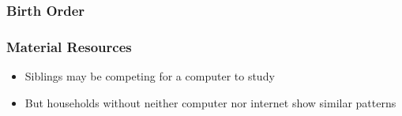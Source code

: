 \documentclass{beamer}
\begin{document}
\begin{frame}
    \label{frame:birthorder_intro}
    \frametitle{Birth Order}
        {
    }  

    \begin{flushleft}
        \hyperlink{frame:mechanisms}{}
    \end{flushleft}
\end{frame}


\begin{frame}
    \label{frame:resources_intro}
    \frametitle{Material Resources}
       \begin{itemize}
           \item Siblings may be competing for a computer to study
           \item But households without neither computer nor internet show similar patterns 
       \end{itemize}
\end{frame}
\end{document}
